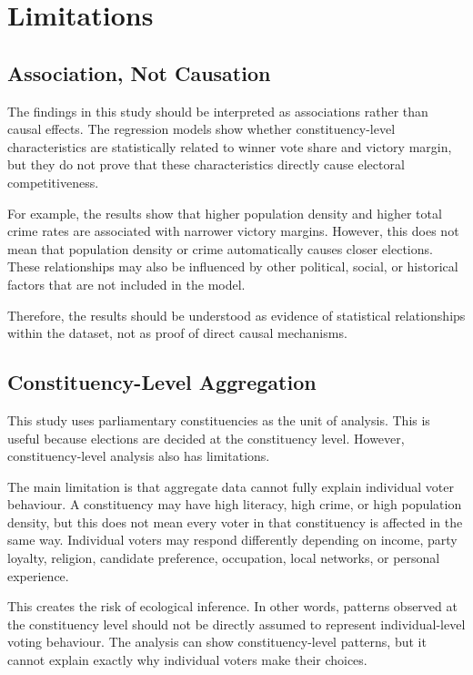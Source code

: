 \documentclass[12pt,a4paper]{article}
\begin{document}
\section{Limitations}

\subsection{Association, Not Causation}

The findings in this study should be interpreted as associations rather than causal effects. The regression models show whether constituency-level characteristics are statistically related to winner vote share and victory margin, but they do not prove that these characteristics directly cause electoral competitiveness.

For example, the results show that higher population density and higher total crime rates are associated with narrower victory margins. However, this does not mean that population density or crime automatically causes closer elections. These relationships may also be influenced by other political, social, or historical factors that are not included in the model.

Therefore, the results should be understood as evidence of statistical relationships within the dataset, not as proof of direct causal mechanisms.

\subsection{Constituency-Level Aggregation}

This study uses parliamentary constituencies as the unit of analysis. This is useful because elections are decided at the constituency level. However, constituency-level analysis also has limitations.

The main limitation is that aggregate data cannot fully explain individual voter behaviour. A constituency may have high literacy, high crime, or high population density, but this does not mean every voter in that constituency is affected in the same way. Individual voters may respond differently depending on income, party loyalty, religion, candidate preference, occupation, local networks, or personal experience.

This creates the risk of ecological inference. In other words, patterns observed at the constituency level should not be directly assumed to represent individual-level voting behaviour. The analysis can show constituency-level patterns, but it cannot explain exactly why individual voters make their choices.
\end{document}
